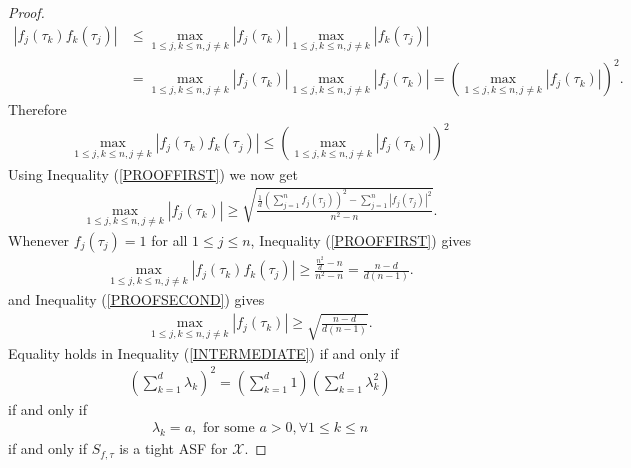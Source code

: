 \documentclass[10pt,a4paper]{amsart}
\begin{document}
\begin{proof}
  \begin{align*}
  |f_j(\tau_k)f_k(\tau_j)|&\leq \max _{1\leq j,k \leq n, j\neq k}|f_j(\tau_k)|\max _{1\leq j,k \leq n, j\neq k}|f_k(\tau_j)|\\
  &=\max _{1\leq j,k \leq n, j\neq k}|f_j(\tau_k)|\max _{1\leq j,k \leq n, j\neq k}|f_j(\tau_k)|=\left(\max _{1\leq j,k \leq n, j\neq k}|f_j(\tau_k)|\right)^2.
  \end{align*}
  Therefore 
  \begin{align*}
  \max _{1\leq j,k \leq n, j\neq k}|f_j(\tau_k)f_k(\tau_j)|\leq \left(\max _{1\leq j,k \leq n, j\neq k}|f_j(\tau_k)|\right)^2
  \end{align*}
  Using Inequality (\ref{PROOFFIRST}) we now get 
  	\begin{align}\label{PROOFSECOND}
  \max _{1\leq j,k \leq n, j\neq k}|f_j(\tau_k)|\geq \sqrt{\frac{\frac{1}{d}	\left(\sum_{j=1}^n
  		f_j(\tau_j)\right)^2-	\sum_{j=1}^n
  		|f_j(\tau_j)|^2}{n^2-n}}.
  \end{align}
  Whenever $f_j(\tau_j)=1$ for all $1\leq j \leq n$, Inequality  (\ref{PROOFFIRST}) gives 
  \begin{align*}
\max _{1\leq j,k \leq n, j\neq k}|f_j(\tau_k)f_k(\tau_j)|\geq \frac{\frac{n^2}{d}-n}{n^2-n}=\frac{n-d}{d(n-1)}.
  \end{align*}
   and Inequality (\ref{PROOFSECOND}) gives 
   \begin{align*}
   \max _{1\leq j,k \leq n, j\neq k}|f_j(\tau_k)|\geq \sqrt{\frac{n-d}{d(n-1)}}.
   \end{align*}
   Equality   holds in Inequality  (\ref{INTERMEDIATE}) if and only if 
   \begin{align*}
   \left(\sum_{k=1}^d
   \lambda_k\right)^2= \left(\sum_{k=1}^d1\right) \left(\sum_{k=1}^d
   \lambda_k^2\right)
   \end{align*}
   if and only if 
   \begin{align*}
   \lambda_k=a, \text{ for some } a>0, \forall 1\leq k \leq n
   \end{align*}
   if and only if $S_{f,\tau}$ is a tight ASF for $\mathcal{X}$. 
  \end{proof}
\end{document}

